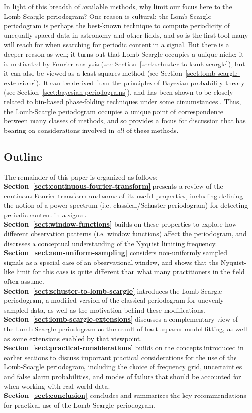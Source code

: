 \documentclass[preprint]{aastex}
\newcommand{\Sect}[1]{Section~\ref{sect:#1}}
\newcommand{\sect}[1]{\Sect{#1}}
\begin{document}
In light of this breadth of available methods, why limit our focus here to the
Lomb-Scargle periodogram?
One reason is cultural: the Lomb-Scargle periodogram is perhaps the best-known
technique to compute periodicity of unequally-spaced data in astronomy and
other fields, and so is the first tool many will reach for
when searching for periodic content in a signal.
But there is a deeper reason as well; it turns out that Lomb-Scargle occupies
a unique niche: it is motivated by Fourier analysis (see \sect{schuster-to-lomb-scargle}),
but it can also be viewed as a least squares method
(see \sect{lomb-scargle-extensions}).
It can be derived from the principles
of Bayesian probability theory (see \sect{bayesian-periodograms}), and has
been shown to be closely related to bin-based phase-folding techniques under
some circumstances \citep[see][]{Swingler89}.
Thus, the Lomb-Scargle periodogram occupies a unique point of correspondence
between many classes of methods, and so provides a focus for discussion that
has bearing on considerations involved in {\it all} of these methods.

\subsection{Outline}
The remainder of this paper is organized as follows:\\
{\bf\sect{continuous-fourier-transform}} presents a review of the
continous Fourier transform and some of its useful properties,
including defining the notion of a power spectrum (i.e. classical/Schuster
periodogram) for detecting periodic content in a signal.\\
{\bf\sect{window-functions}} builds on these properties to explore how
different observation patterns (i.e. window functions) affect the
periodogram, and discusses a conceptual understanding of the
Nyquist limiting frequency.\\
{\bf\sect{non-uniform-sampling}} considers non-uniformly sampled signals as
a special case of an observational window, and shows that the Nyquist-like
limit for this case is quite different than what many practitioners in
the field often assume.\\
{\bf\sect{schuster-to-lomb-scargle}} introduces the Lomb-Scargle periodogram,
a modified version of the classical periodogram for unevenly-sampled data,
as well as the motivation behind these modifications.\\
{\bf\sect{lomb-scargle-extensions}} discusses a complementary view of the
Lomb-Scargle periodogram as the result of least-squares model fitting,
as well as some extensions enabled by that viewpoint.\\
{\bf\sect{practical-considerations}} builds on the concepts introduced
in earlier sections to discuss important practical considerations for
the use of the Lomb-Scargle periodogram, including the choice of
frequency grid, uncertainties and false alarm probabilities, and modes of
failure that should be accounted for when working with real-world data.\\
{\bf\sect{conclusion}} concludes and summarizes the key recommendations
for practical use of the Lomb-Scargle periodogram.
\end{document}

